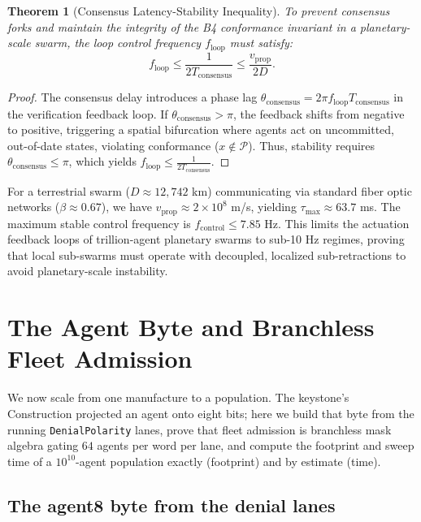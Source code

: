 \documentclass[11pt,oneside]{book}
\theoremstyle{definition}
\theoremstyle{plain}
\newtheorem{theorem}{Theorem}[chapter]
\theoremstyle{remark}
\newcommand{\code}[1]{\texttt{#1}}
\begin{document}
\begin{theorem}[Consensus Latency-Stability Inequality]\label{thm:latency_bound}
To prevent consensus forks and maintain the integrity of the B4 conformance invariant in a planetary-scale swarm, the loop control frequency $f_{\mathrm{loop}}$ must satisfy:
\[
f_{\mathrm{loop}} \le \frac{1}{2 T_{\mathrm{consensus}}} \le \frac{v_{\mathrm{prop}}}{2 D}.
\]
\end{theorem}

\begin{proof}
The consensus delay introduces a phase lag $\theta_{\mathrm{consensus}} = 2 \pi f_{\mathrm{loop}} T_{\mathrm{consensus}}$ in the verification feedback loop. %
If $\theta_{\mathrm{consensus}} > \pi$, the feedback shifts from negative to positive, triggering a spatial bifurcation where agents act on uncommitted, out-of-date states, violating conformance ($x \notin \mathcal{P}$). %
Thus, stability requires $\theta_{\mathrm{consensus}} \le \pi$, which yields $f_{\mathrm{loop}} \le \frac{1}{2 T_{\mathrm{consensus}}}$. %
\end{proof}

For a terrestrial swarm ($D \approx 12,742$ km) communicating via standard fiber optic networks ($\beta \approx 0.67$), we have $v_{\mathrm{prop}} \approx 2 \times 10^8$ m/s, yielding $\tau_{\mathrm{max}} \approx 63.7$ ms. %
The maximum stable control frequency is $f_{\mathrm{control}} \le 7.85$ Hz. %
This limits the actuation feedback loops of trillion-agent planetary swarms to sub-10 Hz regimes, proving that local sub-swarms must operate with decoupled, localized sub-retractions to avoid planetary-scale instability. %

\chapter{The Agent Byte and Branchless Fleet Admission}
\label{ch:agent8}

We now scale from one manufacture to a population. %
The keystone's Construction projected an agent onto eight bits; here we build that byte from the running \code{DenialPolarity} lanes, prove that fleet admission is branchless mask algebra gating $64$ agents per word per lane, and compute the footprint and sweep time of a $10^{10}$-agent population exactly (footprint) and by estimate (time). %

\section{The agent8 byte from the denial lanes}
\end{document}
